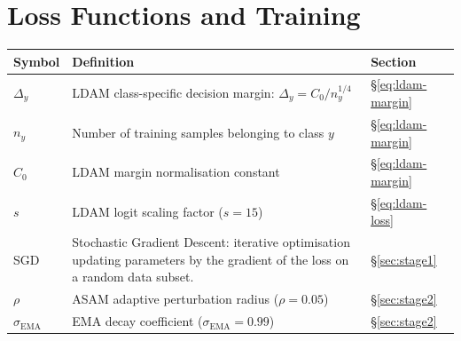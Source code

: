 \section*{Loss Functions and Training}
\begin{center}
\renewcommand{\arraystretch}{1.4}
\begin{tabular}{p{2.8cm} p{9.5cm} p{1.6cm}}
  \hline
  \textbf{Symbol} & \textbf{Definition} & \textbf{Section} \\
  \hline
  $\Delta_y$
    & LDAM class-specific decision margin:
      $\Delta_y = C_0 / n_y^{1/4}$
    & §\ref{eq:ldam-margin} \\
  $n_y$
    & Number of training samples belonging to class $y$
    & §\ref{eq:ldam-margin} \\
  $C_0$
    & LDAM margin normalisation constant
    & §\ref{eq:ldam-margin} \\
  $s$
    & LDAM logit scaling factor ($s = 15$)
    & §\ref{eq:ldam-loss} \\
  SGD
    & Stochastic Gradient Descent: iterative
      optimisation updating parameters by the gradient
      of the loss on a random data subset.
    & §\ref{sec:stage1} \\
  $\rho$
    & ASAM adaptive perturbation radius ($\rho = 0.05$)
    & §\ref{sec:stage2} \\
  $\sigma_{\mathrm{EMA}}$
    & EMA decay coefficient ($\sigma_{\mathrm{EMA}} = 0.99$)
    & §\ref{sec:stage2} \\
  \hline
\end{tabular}
\end{center}

